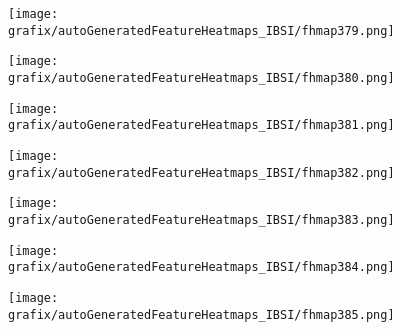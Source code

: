 \begin{subfigure}{\wid\textwidth} 
    \centering 
    \caption{\tiny \sffamily {}} 
    \vspace{\vsp} 
    \texttt{[image: grafix/autoGeneratedFeatureHeatmaps\_IBSI/fhmap379.png]} 
\end{subfigure} 
\hspace{\hsp} 
\begin{subfigure}{\wid\textwidth} 
    \centering 
    \caption{\tiny \sffamily {}} 
    \vspace{\vsp} 
    \texttt{[image: grafix/autoGeneratedFeatureHeatmaps\_IBSI/fhmap380.png]} 
\end{subfigure} 
\hspace{\hsp} 
\begin{subfigure}{\wid\textwidth} 
    \centering 
    \caption{\tiny \sffamily {}} 
    \vspace{\vsp} 
    \texttt{[image: grafix/autoGeneratedFeatureHeatmaps\_IBSI/fhmap381.png]} 
\end{subfigure} 
\hspace{\hsp} 
\begin{subfigure}{\wid\textwidth} 
    \centering 
    \caption{\tiny \sffamily {}} 
    \vspace{\vsp} 
    \texttt{[image: grafix/autoGeneratedFeatureHeatmaps\_IBSI/fhmap382.png]} 
\end{subfigure} 
\hspace{\hsp} 
\begin{subfigure}{\wid\textwidth} 
    \centering 
    \caption{\tiny \sffamily {}} 
    \vspace{\vsp} 
    \texttt{[image: grafix/autoGeneratedFeatureHeatmaps\_IBSI/fhmap383.png]} 
\end{subfigure} 
\hspace{\hsp} 
\begin{subfigure}{\wid\textwidth} 
    \centering 
    \caption{\tiny \sffamily {}} 
    \vspace{\vsp} 
    \texttt{[image: grafix/autoGeneratedFeatureHeatmaps\_IBSI/fhmap384.png]} 
\end{subfigure} 
\hspace{\hsp} 
\begin{subfigure}{\wid\textwidth} 
    \centering 
    \caption{\tiny \sffamily {}} 
    \vspace{\vsp} 
    \texttt{[image: grafix/autoGeneratedFeatureHeatmaps\_IBSI/fhmap385.png]} 
\end{subfigure} 
